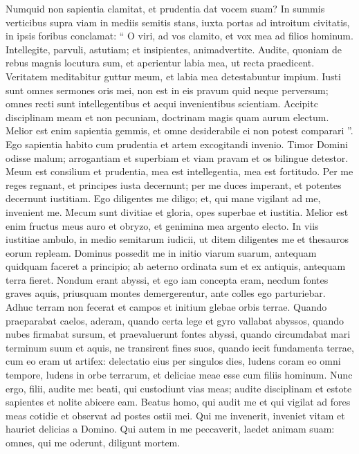 \begin{biblechapter}
\begin{biblechapter}
\begin{biblechapter}
\begin{biblechapter}
\begin{biblechapter}
\begin{biblechapter}
\begin{biblechapter}
\begin{biblechapter}
 \verse Numquid non sapientia clamitat,
 et prudentia dat vocem suam?
 \verse In summis verticibus
 supra viam in mediis semitis stans,
 \verse iuxta portas ad introitum civitatis,
 in ipsis foribus conclamat:
 \verse “ O viri, ad vos clamito,
 et vox mea ad filios hominum.
 \verse Intellegite, parvuli, astutiam;
 et insipientes, animadvertite.
 \verse Audite, quoniam de rebus magnis locutura sum,
 et aperientur labia mea, ut recta praedicent.
 \verse Veritatem meditabitur guttur meum,
 et labia mea detestabuntur impium.
 \verse Iusti sunt omnes sermones oris mei,
 non est in eis pravum quid neque perversum;
 \verse omnes recti sunt intellegentibus
 et aequi invenientibus scientiam.
 \verse Accipitc disciplinam meam et non pecuniam,
 doctrinam magis quam aurum electum.
 \verse Melior est enim sapientia gemmis,
 et omne desiderabile ei non potest comparari ”.
 \verse Ego sapientia habito cum prudentia
 et artem excogitandi invenio.
 \verse Timor Domini odisse malum;
 arrogantiam et superbiam et viam pravam
 et os bilingue detestor.
 \verse Meum est consilium et prudentia,
 mea est intellegentia, mea est fortitudo.
 \verse Per me reges regnant,
 et principes iusta decernunt;
 \verse per me duces imperant,
 et potentes decernunt iustitiam.
 \verse Ego diligentes me diligo;
 et, qui mane vigilant ad me, invenient me.
 \verse Mecum sunt divitiae et gloria,
 opes superbae et iustitia.
 \verse Melior est enim fructus meus auro et obryzo,
 et genimina mea argento electo.
 \verse In viis iustitiae ambulo,
 in medio semitarum iudicii,
 \verse ut ditem diligentes me
 et thesauros eorum repleam.
 \verse Dominus possedit me in initio viarum suarum,
 antequam quidquam faceret a principio;
 \verse ab aeterno ordinata sum
 et ex antiquis, antequam terra fieret.
 \verse Nondum erant abyssi, et ego iam concepta eram,
 necdum fontes graves aquis,
 \verse priusquam montes demergerentur,
 ante colles ego parturiebar.
 \verse Adhuc terram non fecerat et campos
 et initium glebae orbis terrae.
 \verse Quando praeparabat caelos, aderam,
 quando certa lege et gyro vallabat abyssos,
 \verse quando nubes firmabat sursum,
 et praevaluerunt fontes abyssi,
 \verse quando circumdabat mari terminum suum
 et aquis, ne transirent fines suos,
 quando iecit fundamenta terrae,
 \verse cum eo eram ut artifex:
 delectatio eius per singulos dies,
 ludens coram eo omni tempore,
 \verse ludens in orbe terrarum,
 et deliciae meae esse cum filiis hominum.
 \verse Nunc ergo, filii, audite me:
 beati, qui custodiunt vias meas;
 \verse audite disciplinam et estote sapientes
 et nolite abicere eam.
 \verse Beatus homo, qui audit me
 et qui vigilat ad fores meas cotidie
 et observat ad postes ostii mei.
 \verse Qui me invenerit, inveniet vitam
 et hauriet delicias a Domino.
 \verse Qui autem in me peccaverit, laedet animam suam:
 omnes, qui me oderunt, diligunt mortem.
 

\end{biblechapter}
\end{biblechapter}
\end{biblechapter}
\end{biblechapter}
\end{biblechapter}
\end{biblechapter}
\end{biblechapter}
\end{biblechapter}
